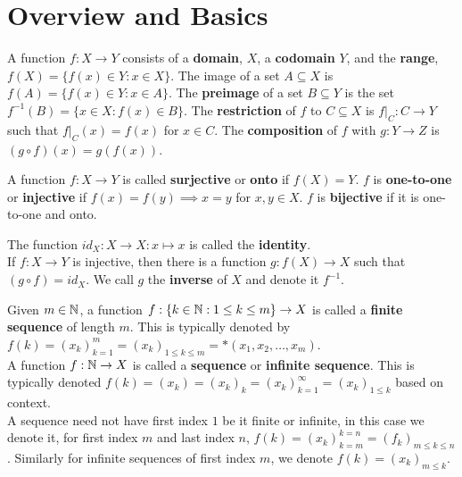 \section{Overview and Basics}
\begin{definition}[Functions]
	A function $f:X \to Y$ consists of a  \textbf{domain}, $X$, a \textbf{codomain} $Y$, and the \textbf{range},  $f\left( X \right) = \{f\left( x \right) \in Y : x \in X\} $. The image of a set $A\subseteq X$ is $f\left( A \right) = \{f\left( x \right) \in Y: x \in A\} $. The \textbf{preimage} of a set $B\subseteq Y$ is the set $f^{-1} \left( B \right) = \{x \in X: f\left( x \right) \in B\} $. The \textbf{restriction} of $f$ to $C \subseteq X$ is $f|_{C}: C \to Y$ such that $f|_{C}\left( x \right) = f\left( x \right) $ for $x \in C$. The \textbf{composition} of $f$ with $g: Y \to Z$ is $\left( g \circ f \right)\left( x \right) = g\left( f\left( x \right)  \right) $.
\end{definition}
\begin{definition}
	A function $f:X \to Y$ is called \textbf{surjective} or \textbf{onto} if $f\left( X \right) = Y$. $f$ is \textbf{one-to-one} or  \textbf{injective} if $f\left( x \right) = f\left( y \right) \implies x=y$ for $x, y \in X$. $f$ is \textbf{bijective} if it is one-to-one and onto.
\end{definition}
\begin{example}
	The function $id_{X}: X \to X : x \mapsto x$ is called the \textbf{identity}.\\
	If $f:X \to Y$ is injective, then there is a function $g: f\left( X \right) \to X$ such that $\left( g \circ f \right) = id_{X}$. We call $g$ the \textbf{inverse} of $X$ and denote it $f^{-1}$.\\
\end{example}
\begin{definition}[Sequences]
	Given $m \in \mathbb{N}$, a function $f: \{k \in \mathbb{N} : 1 \le k \le m\} \to X $ is called a \textbf{finite sequence} of length $m$. This is typically denoted by $f\left( k \right) = \left( x_{k} \right)_{k=1}^{m} = \left( x_{k} \right)_{1\le k\le m}= *\left( x_1, x_2, \ldots, x_{m} \right)  $. \\
	A function $f:\mathbb{N} \to X$ is called a \textbf{sequence} or \textbf{infinite sequence}. This is typically denoted $f\left( k \right) = \left( x_{k} \right) = \left( x_{k} \right)_{k}= \left( x_{k} \right)_{k=1}^{\infty}= \left( x_{k} \right)_{1\le k} $ based on context.\\
	A sequence need not have first index $1$ be it finite or infinite, in this case we denote it, for first index $m$ and last index $n$, $f\left( k \right) = \left( x_{k} \right)_{k=m}^{k=n}= \left( f_{k} \right) _{m\le k \le n} $. Similarly for infinite sequences of first index $m$, we denote $f\left( k \right) = \left( x_{k} \right) _{m\le k}$.
\end{definition}
